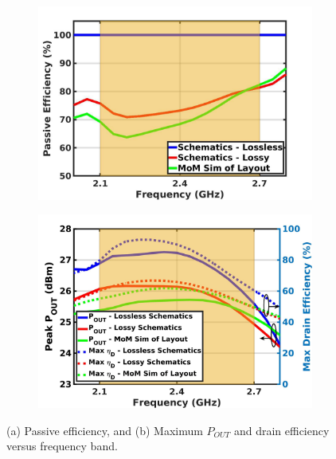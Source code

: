 \documentclass[conference]{IEEEtran}
\begin{document}
\begin{figure}[!t]
\captionsetup{font=footnotesize}
\centering
\begin{subfigure}{0.24\textwidth}
\centering
\includegraphics[width=1\textwidth]{Images/Output_Network_Comp/Comp_PasEff_loss_layout_km0p69.pdf}
\caption{}
\label{fig:Comp_PasEff_loss_layout_km0p69}
\end{subfigure}
\begin{subfigure}{0.24\textwidth}
\includegraphics[width=1\textwidth]{Images/Output_Network_Comp/Comp_Pout_DE_loss_layout_km0p69.pdf}
\caption{}
\label{fig:Comp_Pout_DE_loss_layout_km0p69}
\end{subfigure}
\caption{(a) Passive efficiency, and (b) Maximum $P_{OUT}$ and drain efficiency versus frequency band.}
\label{fig:Comp_Pout_DE}
\end{figure}
\end{document}
